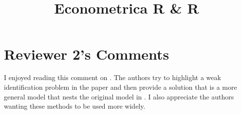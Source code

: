 \documentclass{article}[11pt]
\title{Econometrica R \& R}
\author{}
\date{}
\begin{document}
\setlength{\parindent}{0pt} %
\setlength{\parskip}{\medskipamount}

\pagestyle{fancy}
\fancyhead{} %

\onehalfspacing

\section*{Reviewer 2's Comments}

\renewcommand{\thetable}{R2-\arabic{table}}

I enjoyed reading this comment on \citet{S2011}. The authors try to highlight a weak identification problem in the paper and then provide a solution that is a more general model that nests the original model in \citet{S2011}. I also appreciate the authors wanting these methods to be used more widely.
\end{document}

